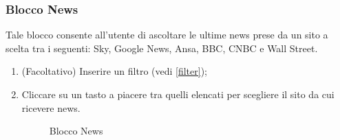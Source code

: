 \subsubsection{Blocco News}
Tale blocco consente all'utente di ascoltare le ultime news prese da un sito a scelta tra i seguenti: Sky, Google News, Ansa, BBC, CNBC e Wall Street.
\begin{enumerate}
	\item (Facoltativo) Inserire un filtro (vedi \ref{filter});
	\item Cliccare su un tasto a piacere tra quelli elencati per scegliere il sito da cui ricevere news.
	\begin{figure}[!ht]
		\centering
		\caption{Blocco News}
	\end{figure}
\end{enumerate}
\newpage

